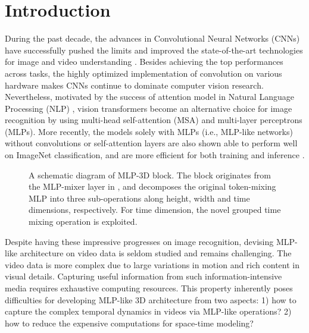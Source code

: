 \documentclass[10pt,twocolumn,letterpaper]{article}
\begin{document}
\section{Introduction}
During the past decade, the advances in Convolutional Neural Networks (CNNs) have successfully pushed the limits and improved the state-of-the-art technologies for image and video understanding \cite{he2015deep,hu2018squeeze,krizhevsky2012imagenet,simonyan2014very,qiu2017learning,carreira2017quo,tran2015learning,wang2018non,qiu2019learning,feichtenhofer2019slowfast,feichtenhofer2020x3d,qiu2021condensing,qiu2021boosting,li2021representing,qiu2017deep,yao2021seco,li2021motion}.
Besides achieving the top performances across tasks, the highly optimized implementation of convolution on various hardware makes CNNs continue to dominate computer vision research. Nevertheless, motivated by the success of attention model in Natural Language Processing (NLP) \cite{vaswani2017attention}, vision transformers \cite{dosovitskiy2020image,touvron2021training,huang2021shuffle,wang2021pyramid,liu2021swin,li2021contextual} become an alternative choice for image recognition by using multi-head self-attention (MSA) and multi-layer perceptrons (MLPs). More recently, the models solely with MLPs (i.e., MLP-like networks) without convolutions or self-attention layers are also shown able to perform well on ImageNet classification, and are more efficient for both training and inference \cite{yu2021s,chen2021cyclemlp,tolstikhin2021mlp,hou2021vision}.

\begin{figure}[!tb]
   \vspace{-0.1in}
   \caption{\small A schematic diagram of MLP-3D block. The block originates from the MLP-mixer layer in \cite{tolstikhin2021mlp}, and decomposes the original token-mixing MLP into three sub-operations along height, width and time dimensions, respectively. For time dimension, the novel grouped time mixing operation is exploited.}
   \label{fig:intro}
   \vspace{-0.2in}
\end{figure}

Despite having these impressive progresses on image recognition, devising MLP-like architecture on video data is seldom studied and remains challenging. The video data is more complex due to large variations in motion and rich content in visual details. Capturing useful information from such information-intensive media requires exhaustive computing resources. This property inherently poses difficulties for developing MLP-like 3D architecture from two aspects: 1) how to capture the complex temporal dynamics in videos via MLP-like operations? 2) how to reduce the expensive computations for space-time modeling?
\end{document}
